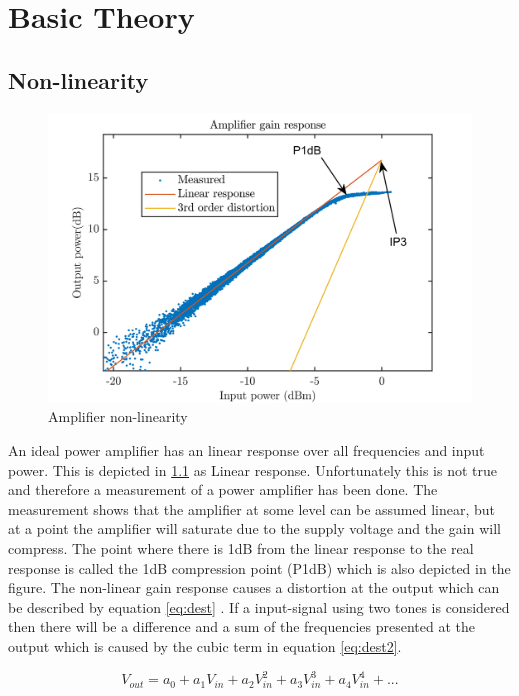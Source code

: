 \chapter{Basic Theory}\label{ch:1}

\section{Non-linearity}

\begin{figure}[H]
\centering 
\includegraphics[scale = 0.8]{figures/ch1/amp_lin.png}
\caption{Amplifier non-linearity}
\label{fig:amp_lin}
\end{figure} 

An ideal power amplifier has an linear response over all frequencies and input power. This is depicted in \ref{fig:amp_lin} as Linear response. Unfortunately this is not true and therefore a measurement of a power amplifier has been done. The measurement shows that the amplifier at some level can be assumed linear, but at a point the amplifier will saturate due to the supply voltage and the gain will compress. The point where there is 1dB from the linear response to the real response is called the 1dB compression point (P1dB) which is also depicted in the figure. The non-linear gain response causes a distortion at the output which can be described by equation \ref{eq:dest} \citep{NI}. If a input-signal using two tones is considered then there will be a difference and a sum of the frequencies presented at the output which is caused by the cubic term in equation \ref{eq:dest2}.

\begin{equation} \label{eq:dest}
V_{out} = a_0 + a_1 V_{in} + a_2 V_{in}^2 + a_3 V_{in}^3 + a_4 V_{in}^4 + ... 
\end{equation}

